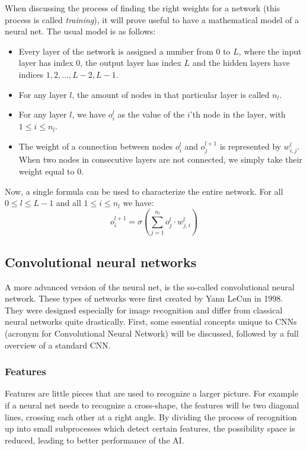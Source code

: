 \documentclass[12pt, titlepage]{article}
\begin{document}
    When discussing the process of finding the right weights for a network (this process is called \textit{training}), it will prove useful to have a mathematical model of a neural net. The usual model is as follows:
    \begin{itemize}
        \item Every layer of the network is assigned a number from $0$ to $L$, where the input layer has index $0$, the output layer has index $L$ and the hidden layers have indices $1,2,\ldots,L-2,L-1$.
        \item For any layer $l$, the amount of nodes in that particular layer is called $n_l$.
        \item For any layer $l$, we have $o^l_i$ as the value of the $i$'th node in the layer, with $1\le i\le n_l$.
        \item The weight of a connection between nodes $o^l_i$ and $o^{l+1}_j$ is represented by $w^l_{i,j}$. When two nodes in consecutive layers are not connected, we simply take their weight equal to $0$.
    \end{itemize}
    Now, a single formula can be used to characterize the entire network. For all $0\le l\le L-1$ and all $1\le i\le n_l$ we have:
    \begin{equation*}
    o^{l+1}_i = \sigma\left(\sum_{j=1}^{n_{l}}o^{l}_j\cdot w^{l}_{j,i}\right)
    \end{equation*}
    
    \subsection{Convolutional neural networks}
    A more advanced version of the neural net, is the so-called convolutional neural network. These types of networks were first created by Yann LeCun \cite{lecun} in 1998. They were designed especially     for image recognition and differ from classical neural networks quite drastically. First, some essential concepts unique to CNNs (acronym for Convolutional Neural Network) will be discussed, followed by a full overview of a standard CNN.
    
    \subsubsection{Features}
    Features are little pieces that are used to recognize a larger picture. For example if a neural net needs to recognize a cross-shape, the features will be two diagonal lines, crossing each other at a right angle. By dividing the process of recognition up into small subprocesses which detect certain features, the possibility space is reduced, leading to better performance of the AI.
    
\end{document}
